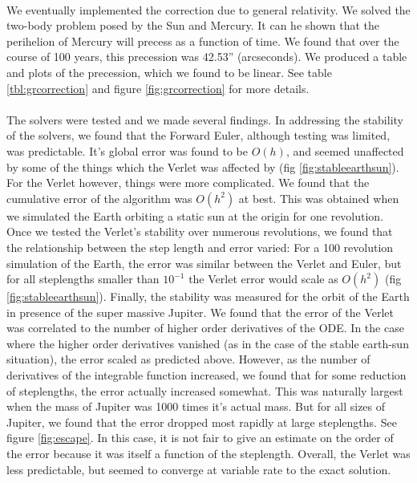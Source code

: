 \documentclass[11pt,english,a4paper]{article}
\begin{document}
\\
We eventually implemented the correction due to general relativity. We solved the two-body problem posed by the Sun and Mercury. It can he shown that the perihelion of Mercury will precess as a function of time. We found that over the course of 100 years, this precession was 42.53'' (arcseconds). We produced a table and plots of the precession, which we found to be linear. See table \ref{tbl:grcorrection} and figure \ref{fig:grcorrection} for more details.
\\
\\
The solvers were tested and we made several findings. In addressing the stability of the solvers, we found that the Forward Euler, although testing was limited, was predictable. It's global error was found to be $O(h)$, and seemed unaffected by some of the things which the Verlet was affected by (fig \ref{fig:stableearthsun}). For the Verlet however, things were more complicated. We found that the cumulative error of the algorithm was $O(h^2)$ at best. This was obtained when we simulated the Earth orbiting a static sun at the origin for one revolution. Once we tested the Verlet's stability over numerous revolutions, we found that the relationship between the step length and error varied: For a 100 revolution simulation of the Earth, the error was similar between the Verlet and Euler, but for all steplengths smaller than $10^{-1}$ the Verlet error would scale as $O(h^2)$ (fig \ref{fig:stableearthsun}). Finally, the stability was measured for the orbit of the Earth in presence of the super massive Jupiter. We found that the error of the Verlet was correlated to the number of higher order derivatives of the ODE. In the case where the higher order derivatives vanished (as in the case of the stable earth-sun situation), the error scaled as predicted above. However, as the number of derivatives of the integrable function increased, we found that for some reduction of steplengths, the error actually increased somewhat. This was naturally largest when the mass of Jupiter was 1000 times it's actual mass. But for all sizes of Jupiter, we found that the error dropped most rapidly at large steplengths. See figure \ref{fig:escape}. In this case, it is not fair to give an estimate on the order of the error because it was itself a function of the steplength. Overall, the Verlet was less predictable, but seemed to converge at variable rate to the exact solution.\\
\\
\end{document}
